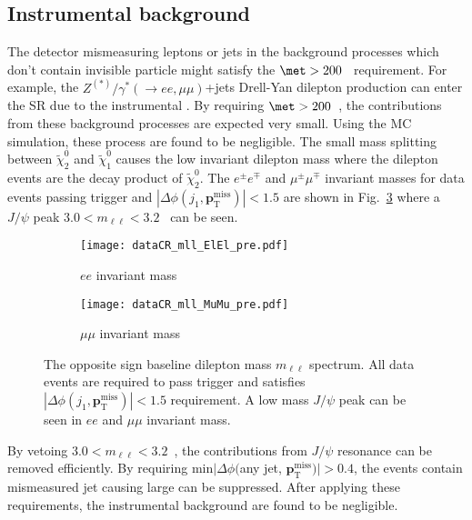 \subsection{Instrumental \met background}
\label{subsec:bkg_instrumental_met_background}
The detector mismeasuring leptons or jets in the background processes which don't contain invisible particle might satisfy the $\met > 200$~{\GeV} requirement.
For example, the $Z^{(*)}/\gamma^{*}(\to ee, \mu \mu)$+jets Drell-Yan dilepton production can enter the SR due to the instrumental \met.
By requiring $\met > 200$~{\GeV}, the contributions from these background processes are expected very small.
Using the MC simulation, these process are found to be negligible.
The small mass splitting between $\widetilde{\chi}^{0}_{2}$ and $\widetilde{\chi}^{0}_{1}$ causes the low invariant dilepton mass where the dilepton events are the decay product of $\widetilde{\chi}^{0}_{2}$.
The $e^{\pm} e^{\mp}$ and $\mu^{\pm} \mu^{\mp}$ invariant masses for data events passing \met trigger and $|\Delta \phi(j_{1}, \mathbf{p}_\mathrm{T}^\mathrm{miss})| < 1.5$ are shown in Fig.~\ref{fig:bkg_invariant_mass} where a $J/\psi$ peak $3.0 < m_{\ell \ell} < 3.2$~{\GeV} can be seen.

\begin{figure}[ht]
    \begin{center}
        \begin{subfigure}[b]{0.48\textwidth}
            \texttt{[image: dataCR\_mll\_ElEl\_pre.pdf]}
            \caption{$ee$ invariant mass}
            \label{fig:bkg_ee_invariant_mass}
        \end{subfigure}
        \begin{subfigure}[b]{0.48\textwidth}
            \texttt{[image: dataCR\_mll\_MuMu\_pre.pdf]}
            \caption{$\mu \mu$ invariant mass}
            \label{fig:bkg_mumu_invariant_mass}
        \end{subfigure}
        \caption{The opposite sign baseline dilepton mass $m_{\ell \ell}$ spectrum.
        All data events are required to pass \met trigger and satisfies $|\Delta \phi(j_{1}, \mathbf{p}_\mathrm{T}^\mathrm{miss})| < 1.5$ requirement.
        A low mass $J/\psi$ peak can be seen in $ee$ and $\mu \mu$ invariant mass.}
        \label{fig:bkg_invariant_mass}
    \end{center}
\end{figure}

By vetoing $3.0 < m_{\ell \ell} < 3.2$~{\GeV}, the contributions from $J/\psi$ resonance can be removed efficiently.
By requiring min$|\Delta \phi($any jet, $\mathbf{p}^{\mathrm{miss}}_{\mathrm{T}})| > 0.4$, the events contain mismeasured jet causing large \met can be suppressed.
After applying these requirements, the instrumental \met background are found to be negligible.

